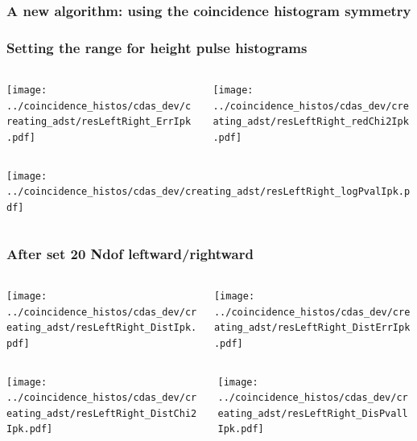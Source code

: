 \documentclass[aspectratio=169]{beamer}
\begin{document}
\begin{frame}
  \frametitle{A new algorithm: using the coincidence histogram
  symmetry}
\end{frame}

\begin{frame}
  \frametitle{Setting the range for height pulse histograms}

  \begin{columns}
    \centering
    \begin{column}{0.5\textwidth}
      \texttt{[image: ../coincidence\_histos/cdas\_dev/creating\_adst/resLeftRight\_ErrIpk.pdf]}
    \end{column}
    \begin{column}{0.5\textwidth}
      \texttt{[image: ../coincidence\_histos/cdas\_dev/creating\_adst/resLeftRight\_redChi2Ipk.pdf]}
    \end{column}
  \end{columns}

  \begin{columns}
    \centering
    \begin{column}{0.5\textwidth}
      \texttt{[image: ../coincidence\_histos/cdas\_dev/creating\_adst/resLeftRight\_logPvalIpk.pdf]}
    \end{column}
  \end{columns}
\end{frame}

\begin{frame}
  \frametitle{After set 20 Ndof leftward/rightward} 
  
  \begin{columns}
    \centering
    \begin{column}{0.5\textwidth}
      \texttt{[image: ../coincidence\_histos/cdas\_dev/creating\_adst/resLeftRight\_DistIpk.pdf]}
    \end{column}
    \begin{column}{0.5\textwidth}
      \texttt{[image: ../coincidence\_histos/cdas\_dev/creating\_adst/resLeftRight\_DistErrIpk.pdf]}
    \end{column}
  \end{columns}

  \begin{columns}
    \centering
    \begin{column}{0.5\textwidth}
      \texttt{[image: ../coincidence\_histos/cdas\_dev/creating\_adst/resLeftRight\_DistChi2Ipk.pdf]}
    \end{column}
    \begin{column}{0.5\textwidth}
      \texttt{[image: ../coincidence\_histos/cdas\_dev/creating\_adst/resLeftRight\_DisPvallIpk.pdf]}
    \end{column}
  \end{columns}
\end{frame}
\end{document}
